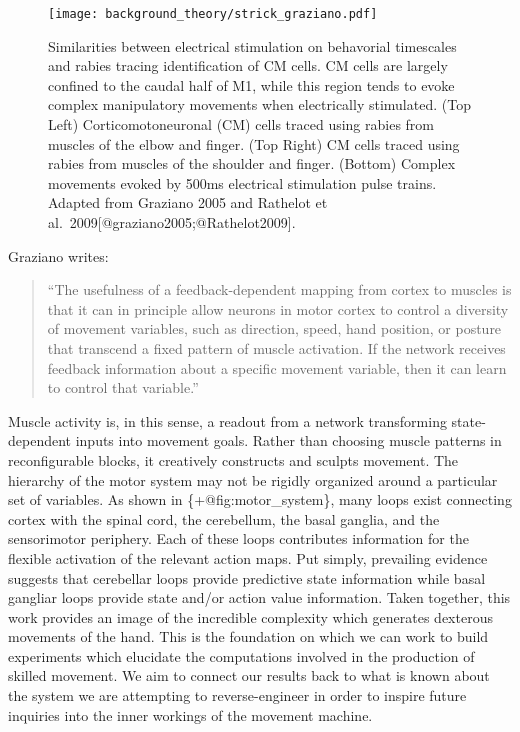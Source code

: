 \documentclass[../main.tex]{subfiles}
\begin{document}
\begin{figure}[H]
  \centering
  \texttt{[image: background\_theory/strick\_graziano.pdf]}
  \caption[Comparing the work of Strick and Graziano]{Similarities between electrical stimulation on behavorial timescales and rabies tracing identification of CM cells. CM cells are largely confined to the caudal half of M1, while this region tends to evoke complex manipulatory movements when electrically stimulated. (Top Left) Corticomotoneuronal (CM) cells traced using rabies from muscles of the elbow and finger. (Top Right) CM cells traced using rabies from muscles of the shoulder and finger. (Bottom) Complex movements evoked by 500ms electrical stimulation pulse trains. Adapted from Graziano 2005 and Rathelot et al.~2009{[}@graziano2005;@Rathelot2009{]}.}\label{fig:strick_graziano}
\end{figure}

Graziano writes:

\begin{quote} 
  ``The usefulness of a feedback-dependent mapping from cortex to muscles is that it can in principle allow neurons in motor cortex to control a diversity of movement variables, such as direction, speed, hand position, or posture that transcend a fixed pattern of muscle activation. If the network receives feedback information about a specific movement variable, then it can learn to control that variable.''
\end{quote}

Muscle activity is, in this sense, a readout from a network transforming state-dependent inputs into movement goals. Rather than choosing muscle patterns in reconfigurable blocks, it creatively constructs and sculpts movement. The hierarchy of the motor system may not be rigidly organized around a particular set of variables. As shown in \{+@fig:motor\_system\}, many loops exist connecting cortex with the spinal cord, the cerebellum, the basal ganglia, and the sensorimotor periphery. Each of these loops contributes information for the flexible activation of the relevant action maps. Put simply, prevailing evidence suggests that cerebellar loops provide predictive state information while basal gangliar loops provide state and/or action value information. Taken together, this work provides an image of the incredible complexity which generates dexterous movements of the hand. This is the foundation on which we can work to build experiments which elucidate the computations involved in the production of skilled movement. We aim to connect our results back to what is known about the system we are attempting to reverse-engineer in order to inspire future inquiries into the inner workings of the movement machine.
\end{document}
